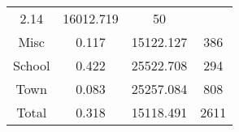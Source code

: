 \documentclass[]{book}
\theoremstyle{definition}
\theoremstyle{definition}
\theoremstyle{definition}
\theoremstyle{remark}
\begin{document}
\begin{longtable}[]{@{}cccc@{}}
\begin{minipage}[t]{0.11\columnwidth}
2.14\strut
\end{minipage} & \begin{minipage}[t]{0.15\columnwidth}\centering\strut
16012.719\strut
\end{minipage} & \begin{minipage}[t]{0.15\columnwidth}\centering\strut
50\strut
\end{minipage}\tabularnewline
\begin{minipage}[t]{0.12\columnwidth}\centering\strut
Misc\strut
\end{minipage} & \begin{minipage}[t]{0.11\columnwidth}\centering\strut
0.117\strut
\end{minipage} & \begin{minipage}[t]{0.15\columnwidth}\centering\strut
15122.127\strut
\end{minipage} & \begin{minipage}[t]{0.15\columnwidth}\centering\strut
386\strut
\end{minipage}\tabularnewline
\begin{minipage}[t]{0.12\columnwidth}\centering\strut
School\strut
\end{minipage} & \begin{minipage}[t]{0.11\columnwidth}\centering\strut
0.422\strut
\end{minipage} & \begin{minipage}[t]{0.15\columnwidth}\centering\strut
25522.708\strut
\end{minipage} & \begin{minipage}[t]{0.15\columnwidth}\centering\strut
294\strut
\end{minipage}\tabularnewline
\begin{minipage}[t]{0.12\columnwidth}\centering\strut
Town\strut
\end{minipage} & \begin{minipage}[t]{0.11\columnwidth}\centering\strut
0.083\strut
\end{minipage} & \begin{minipage}[t]{0.15\columnwidth}\centering\strut
25257.084\strut
\end{minipage} & \begin{minipage}[t]{0.15\columnwidth}\centering\strut
808\strut
\end{minipage}\tabularnewline
\begin{minipage}[t]{0.12\columnwidth}\centering\strut
Total\strut
\end{minipage} & \begin{minipage}[t]{0.11\columnwidth}\centering\strut
0.318\strut
\end{minipage} & \begin{minipage}[t]{0.15\columnwidth}\centering\strut
15118.491\strut
\end{minipage} & \begin{minipage}[t]{0.15\columnwidth}\centering\strut
2611\strut
\end{minipage}\tabularnewline
\bottomrule
\end{longtable}
\end{document}
